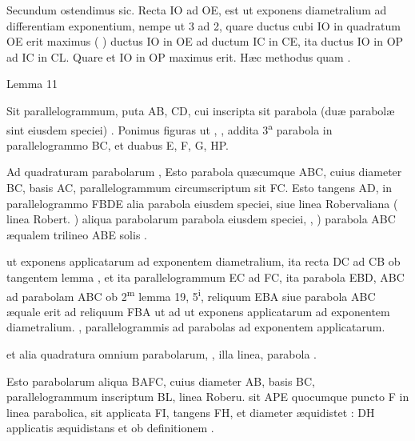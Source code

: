 \documentclass[11pt,a4paper]{article}
\begin{document}
Secundum  ostendimus sic. Recta IO ad OE, est ut exponens diametralium ad differentiam exponentium, nempe ut 3 ad 2, quare ductus cubi IO in quadratum OE erit maximus (  \ill{}   \ill{}  ) \ill{} ductus IO in OE ad ductum IC in CE, ita ductus IO in OP ad IC in CL. Quare et IO in OP maximus erit. Hæc \ill{} \ill{} methodus quam \struck{\ill{}} \ill{} .

Lemma 11

Sit parallelogrammum, puta AB, CD, cui inscripta sit parabola (duæ parabolæ sint eiusdem speciei) \ill{} \ill{} \ill{}. Ponimus \ill{} figuras \ill{} \ill{} ut \ill{}, \ill{} \ill{} \ill{}, addita 3\textsuperscript{a} parabola in parallelogrammo BC, et \ill{} \ill{} duabus \ill{} \ill{} E, F, G, HP.

Ad quadraturam parabolarum \ill{} \ill{}, Esto parabola quæcumque ABC, cuius diameter BC, basis AC, parallelogrammum circumscriptum sit FC. Esto tangens AD, \ill{} in parallelogrammo FBDE alia parabola eiusdem speciei, siue \ill{} linea Robervaliana ( \ill{} linea \ill{} \ill{} Robert. \ill{}) \ill{} \ill{} \ill{} aliqua parabolarum \ill{} \ill{} parabola eiusdem speciei, \ill{} \ill{} \ill{} \ill{}, \ill{} \ill{} \ill{} \ill{}) \ill{} parabola ABC æqualem trilineo ABE \ill{} \ill{} \ill{} \ill{} \ill{} solis \ill{} \ill{} \ill{} \ill{}.

\ill{} ut exponens applicatarum ad exponentem diametralium, ita recta DC ad CB ob tangentem \ill{} \ill{} lemma \ill{}, et ita \ill{} parallelogrammum EC ad FC, \ill{} ita \ill{} parabola EBD, ABC ad parabolam ABC ob 2\textsuperscript{m} lemma \ill{} \ill{} 19, 5\textsuperscript{i}, reliquum EBA siue parabola ABC \ill{} æquale erit ad reliquum FBA ut \ill{} \ill{} ad \ill{} \ill{} ut exponens applicatarum ad exponentem diametralium. \ill{} \ill{}, \ill{} \ill{} parallelogrammis \ill{} ad \ill{} parabolas \ill{} \ill{} \ill{} ad exponentem applicatarum.

\ill{} et alia \ill{} \ill{} \ill{} \ill{} quadratura omnium parabolarum, \ill{} \ill{} \ill{} \ill{} \ill{} \ill{}, \ill{} \ill{} \ill{} \ill{} \ill{} illa \ill{} linea, \ill{} \ill{} \ill{} \ill{} parabola \ill{} \ill{} \ill{}.

Esto parabolarum aliqua BAFC, cuius diameter AB, basis  BC, parallelogrammum inscriptum BL, linea Roberu. \ill{} \ill{} sit  APE \ill{} \ill{} quocumque puncto F in linea parabolica, sit applicata FI, tangens FH, et \ill{} \ill{} diameter æquidistet : \ill{} \ill{} DH applicatis æquidistans et \ill{} \ill{} ob definitionem \ill{}.
\end{document}
